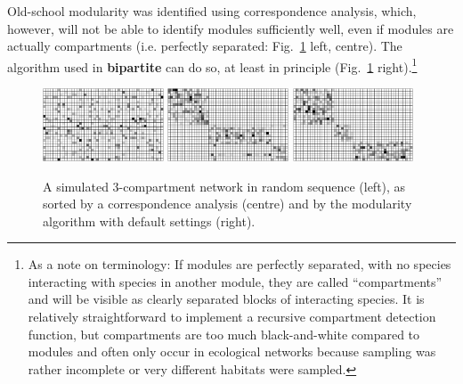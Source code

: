 \documentclass[a4paper, 11pt]{article}\usepackage[]{graphicx}\usepackage[dvipsnames]{xcolor}
\newcommand{\package}[1]{\textbf{#1}}
\begin{document}
Old-school modularity was identified using correspondence analysis, which, however, will not be able to identify modules sufficiently well, even if modules are actually compartments (i.e. perfectly separated: Fig.~\ref{fig:randomCAsorted} left, centre). The algorithm used in \package{bipartite} can do so, at least in principle (Fig.~\ref{fig:randomCAsorted} right).\footnote{As a note on terminology: If modules are perfectly separated, with no species interacting with species in another module, they are called ``compartments'' and will be visible as clearly separated blocks of interacting species. It is relatively straightforward to implement a recursive compartment detection function, but compartments are too much black-and-white compared to modules and often only occur in ecological networks because sampling was rather incomplete or very different habitats were sampled.}
\begin{figure}
	\hfill
	\includegraphics[width=0.32\textwidth]{figures/random_small_high_nonoise_small} %
	\hfill
	\includegraphics[width=0.32\textwidth]{figures/CA_small_high_nonoise_small}%
	\hfill
	\includegraphics[width=0.32\textwidth]{figures/sorted_small_high_nonoise_small}%
	\hfill
	\caption{A simulated 3-compartment network in random sequence (left), as sorted by a correspondence analysis (centre) and by the modularity algorithm with default settings (right).}
\label{fig:randomCAsorted}
\end{figure}
\end{document}
